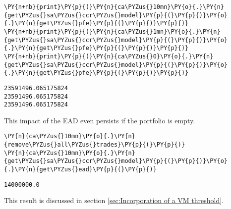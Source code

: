     \begin{tcolorbox}[breakable, size=fbox, boxrule=1pt, pad at break*=1mm,colback=cellbackground, colframe=cellborder]
\begin{Verbatim}[commandchars=\\\{\}]
\PY{n+nb}{print}\PY{p}{(}\PY{n}{ca\PYZus{}10mn}\PY{o}{.}\PY{n}{get\PYZus{}sa\PYZus{}ccr\PYZus{}model}\PY{p}{(}\PY{p}{)}\PY{o}{.}\PY{n}{get\PYZus{}pfe}\PY{p}{(}\PY{p}{)}\PY{p}{)}
\PY{n+nb}{print}\PY{p}{(}\PY{n}{ca\PYZus{}1mn}\PY{o}{.}\PY{n}{get\PYZus{}sa\PYZus{}ccr\PYZus{}model}\PY{p}{(}\PY{p}{)}\PY{o}{.}\PY{n}{get\PYZus{}pfe}\PY{p}{(}\PY{p}{)}\PY{p}{)}
\PY{n+nb}{print}\PY{p}{(}\PY{n}{ca\PYZus{}0}\PY{o}{.}\PY{n}{get\PYZus{}sa\PYZus{}ccr\PYZus{}model}\PY{p}{(}\PY{p}{)}\PY{o}{.}\PY{n}{get\PYZus{}pfe}\PY{p}{(}\PY{p}{)}\PY{p}{)}
\end{Verbatim}
\end{tcolorbox}

    \begin{Verbatim}[commandchars=\\\{\}]
23591496.065175824
23591496.065175824
23591496.065175824
    \end{Verbatim}

    This impact of the EAD even persists if the portfolio is empty.

    \begin{tcolorbox}[breakable, size=fbox, boxrule=1pt, pad at break*=1mm,colback=cellbackground, colframe=cellborder]
\begin{Verbatim}[commandchars=\\\{\}]
\PY{n}{ca\PYZus{}10mn}\PY{o}{.}\PY{n}{remove\PYZus{}all\PYZus{}trades}\PY{p}{(}\PY{p}{)}
\PY{n}{ca\PYZus{}10mn}\PY{o}{.}\PY{n}{get\PYZus{}sa\PYZus{}ccr\PYZus{}model}\PY{p}{(}\PY{p}{)}\PY{o}{.}\PY{n}{get\PYZus{}ead}\PY{p}{(}\PY{p}{)}
\end{Verbatim}
\end{tcolorbox}

            \begin{tcolorbox}[breakable, size=fbox, boxrule=.5pt, pad at break*=1mm, opacityfill=0]
\begin{Verbatim}[commandchars=\\\{\}]
14000000.0
\end{Verbatim}
\end{tcolorbox}
        
    This result is discussed in section
\ref{sec:Incorporation of a VM threshold}.


